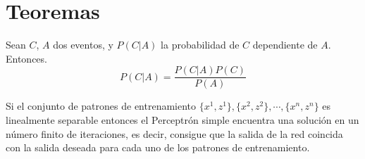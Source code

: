 




\chapter*{Teoremas}


\begin{theorem}[Bayes]
    \label{theorem:bayes}
    Sean $C$, $A$ dos eventos, y $P(C|A)$ la probabilidad de $C$ dependiente de $A$. Entonces.
    \[ P(C|A) = \frac{P(C|A) P(C)}{P(A)} \]
\end{theorem}

\begin{theorem}
    \label{theorem:ConvergenciaRosenblatt}
    Si el conjunto de patrones de entrenamiento $ \{x^{1}, z^{1}\}, \{x^{2}, z^{2}\}, \cdots, \{x^{n}, z^{n}\} $ es linealmente separable entonces el Perceptrón simple encuentra una solución en un número finito de iteraciones, es decir, consigue que la salida de la red coincida con la salida deseada para cada uno de los patrones de entrenamiento.
\end{theorem}